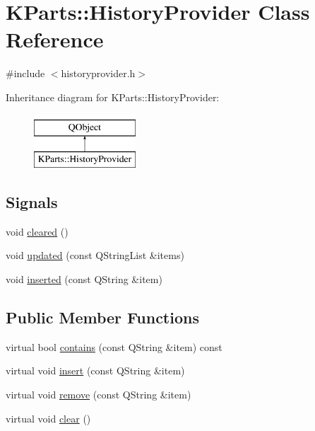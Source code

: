 \hypertarget{classKParts_1_1HistoryProvider}{\section{K\+Parts\+:\+:History\+Provider Class Reference}
\label{classKParts_1_1HistoryProvider}
}


{\ttfamily \#include $<$historyprovider.\+h$>$}

Inheritance diagram for K\+Parts\+:\+:History\+Provider\+:\begin{figure}[H]
\begin{center}
\leavevmode
\includegraphics[height=2.000000cm]{classKParts_1_1HistoryProvider}
\end{center}
\end{figure}
\subsection*{Signals}
\begin{DoxyCompactItemize}
\item 
void \hyperlink{classKParts_1_1HistoryProvider_ac1328e387f0adb62419ddfdd74b1839e}{cleared} ()
\item 
void \hyperlink{classKParts_1_1HistoryProvider_adf153d0a7a3efcdaba20a86e323e115f}{updated} (const Q\+String\+List \&items)
\item 
void \hyperlink{classKParts_1_1HistoryProvider_a24304e5276a1f113314eb7b4e464828f}{inserted} (const Q\+String \&item)
\end{DoxyCompactItemize}
\subsection*{Public Member Functions}
\begin{DoxyCompactItemize}
\item 
virtual bool \hyperlink{classKParts_1_1HistoryProvider_a71a0c077cb80205334b56b0fd257a21d}{contains} (const Q\+String \&item) const 
\item 
virtual void \hyperlink{classKParts_1_1HistoryProvider_aace7bb17dca383aeecda7a34b9e0f40d}{insert} (const Q\+String \&item)
\item 
virtual void \hyperlink{classKParts_1_1HistoryProvider_a5852478b139f20346c53a30543748ed5}{remove} (const Q\+String \&item)
\item 
virtual void \hyperlink{classKParts_1_1HistoryProvider_ac377d52046a807032c21e17e8f03dd1e}{clear} ()
\end{DoxyCompactItemize}
